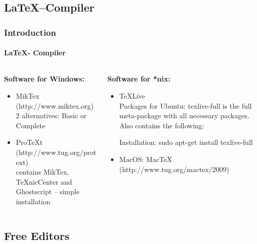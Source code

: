 \subsection{\LaTeX --Compiler}
\begin{frame}
\frametitle{Introduction}
\framesubtitle{\LaTeX - Compiler}
\begin{columns}[t]
\begin{column}{.4\textwidth}
\textbf{Software for Windows:}\\
\begin{itemize}
  \item MikTex (http://www.miktex.org)\\
   2 alternatives: Basic or  Complete
  \item ProTeXt (http://www.tug.org/protext)\\
contains MikTex, TeXnicCenter and Ghostscript – simple installation\\
\end{itemize}
\end{column}
\begin{column}{.6\textwidth}
\textbf{Software for *nix:}
\begin{itemize}
  \item TeXLive\\
Packages for Ubuntu: {\ttfamily texlive-full} is the full meta-package with all necessary packages. Also contains the following:
Installation: {\ttfamily sudo apt-get install texlive-full}
\item MacOS: MacTeX (http://www.tug.org/mactex/2009)\\
\end{itemize}
\end{column}
\end{columns}
\end{frame}


\subsection{Free Editors}

